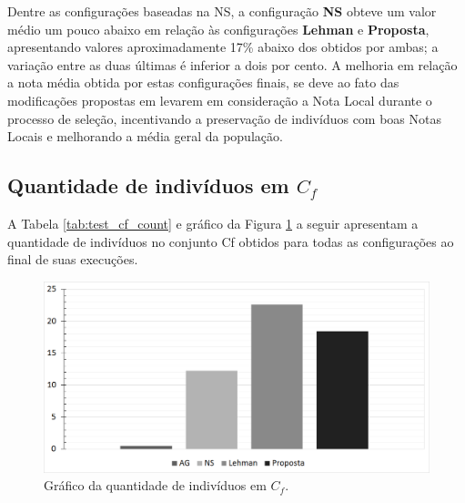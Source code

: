 Dentre as configurações baseadas na NS, a configuração \textbf{NS} obteve um valor médio um pouco abaixo em relação às configurações \textbf{Lehman} e \textbf{Proposta}, apresentando valores aproximadamente 17\% abaixo dos obtidos por ambas; a variação entre as duas últimas é inferior a dois por cento. A melhoria em relação a nota média obtida por estas configurações finais, se deve ao fato das modificações propostas em \cite{lehman2011evolving} levarem em consideração a Nota Local durante o processo de seleção, incentivando a preservação de indivíduos com boas Notas Locais e melhorando a média geral da população.

\subsection{Quantidade de indivíduos em \texorpdfstring{$C_f$}{Cf}}
\label{metrica_cf_count}

A Tabela \ref{tab:test_cf_count} e gráfico da Figura \ref{fig:test_cf_count} a seguir apresentam a quantidade de indivíduos no conjunto Cf obtidos para todas as configurações ao final de suas execuções.

\begin{table}[htb]
\centering
\caption{Valores obtidos por cada configuração para a Quantidade de indivíduos em $C_f$.}
\label{tab:test_cf_count}
\end{table}

\begin{figure}[htb]
	\begin{center}
		\includegraphics[width=1\textwidth]{Imagens/test_cf_count.png}
		\caption{Gráfico da quantidade de indivíduos em $C_f$.}
		\label{fig:test_cf_count}
	\end{center}
\end{figure}

